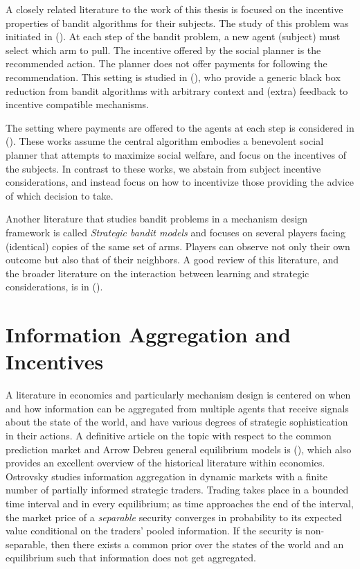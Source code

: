 A closely related literature to the work of this thesis is focused on the incentive properties of bandit algorithms for their subjects.
The study of this problem was initiated in (\cite{kremer2014implementing}).
At each step of the bandit problem, a new agent (subject) must select which arm to pull. 
The  incentive offered by the social planner is the recommended action. The planner does not offer payments for following the recommendation. %
This setting is studied in (\cite{mansour2015bayesian}), who provide a generic black box reduction from bandit algorithms with arbitrary context and (extra) feedback to incentive compatible mechanisms.

The setting where payments are offered to the agents at each step is considered in (\cite{frazier2014incentivizing}).
These works assume the central algorithm embodies a benevolent social planner that attempts to maximize social welfare, and focus on the incentives of the subjects.
In contrast to these works, we abstain from subject incentive considerations, and instead focus on how to incentivize those providing the advice of which decision to take.

Another literature that studies bandit problems in a mechanism design framework is called \emph{Strategic bandit models} and focuses on several players facing (identical) copies of the same set of arms. Players can observe not only their own outcome but also that of their neighbors. A good review of this literature, and the broader literature on the interaction between learning and strategic considerations, is in (\cite{horner2016learning}).

\section{Information Aggregation and Incentives}



A literature in economics and particularly mechanism design is centered on when and how information can be aggregated from multiple agents that receive signals about the state of the world, and have various degrees of strategic sophistication in their actions.
A definitive article on the topic with respect to the common prediction market and Arrow Debreu general equilibrium models is (\cite{ostrovsky2012information}), which also provides an excellent overview of the historical literature within economics.
Ostrovsky studies information aggregation in dynamic markets with a finite number of partially informed strategic traders. 
Trading takes place in a bounded time interval and in every equilibrium; as time approaches the end of the interval, the market price of a \emph{separable} security converges in probability to its expected value conditional on the traders' pooled information. If the security is non-separable, then there exists a common prior over the states of the world and an equilibrium such that information does not get aggregated. 



